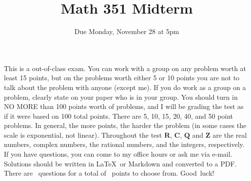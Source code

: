 \documentclass{exam}
\title{Math 351 Midterm}
\author{Due Monday, November 28 at 5pm}
\date{}
\newcommand{\Z}{\mathbb Z}
\newcommand{\C}{\mathbb{C}}
\newcommand{\Q}{\mathbb{Q}}
\newcommand{\R}{\mathbb{R}}
\renewcommand{\mathbb}{\mathbf}
\begin{document}

\maketitle

\setlength{\parindent}{0em} %
\setlength{\parskip}{1em} %


This is a out-of-class exam. You can work with a group on any problem worth at least 15 points, but on the problems worth either 5 or 10 points you are not to talk about the problem with anyone (except me). If you do work as a group on a problem, clearly state on your paper who is in your group. You should turn in NO MORE than 100 points worth of problems, and I will be grading the test as if it were based on 100 total points. There are 5, 10, 15, 20, 40, and 50 point problems. In general, the more points, the harder the problem (in some cases the scale is exponential, not linear). Throughout the test $\R$, $\C$, $\Q$ and $\Z$ are the real numbers, complex numbers, the rational numbers, and the integers, respectively.  If you have questions, you can come to my office hours or ask me via e-mail.  Solutions should be written in \LaTeX\ or Markdown and converted to a PDF. There are \numquestions\ questions for a total of \numpoints\ points to choose from. Good~luck!
\end{document}
